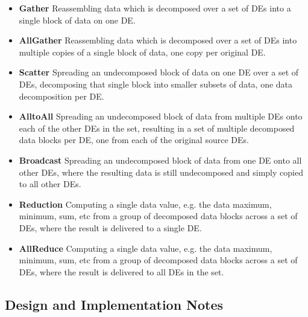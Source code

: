 \begin{itemize}

\item {\bf Gather}
Reassembling data which is decomposed over a set of DEs into a single
block of data on one DE.
\item {\bf AllGather}
Reassembling data which is decomposed over a set of DEs into multiple
copies of a single block of data, one copy per original DE.
\item {\bf Scatter}
Spreading an undecomposed block of data on one DE over a set of DEs,
decomposing that single block into smaller subsets of data, one
data decomposition per DE.
\item {\bf AlltoAll}
Spreading an undecomposed block of data from multiple DEs onto
each of the other DEs in the set, resulting in a set of multiple decomposed 
data blocks per DE, one from each of the original source DEs.
\item {\bf Broadcast}
Spreading an undecomposed block of data from one DE onto all other
DEs, where the resulting data is still undecomposed and simply
copied to all other DEs.
\item {\bf Reduction}
Computing a single data value, e.g. the data maximum, minimum, sum, etc
from a group of decomposed data blocks across a set of DEs, where the
result is delivered to a single DE.
\item {\bf AllReduce}
Computing a single data value, e.g. the data maximum, minimum, sum, etc
from a group of decomposed data blocks across a set of DEs, where the
result is delivered to all DEs in the set.

\end{itemize}

\subsection{Design and Implementation Notes}

